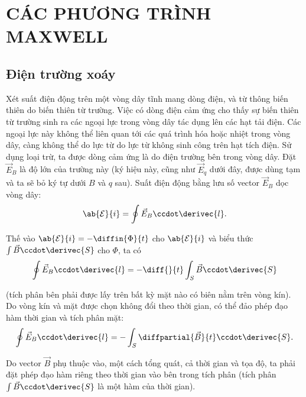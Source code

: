 

\chapter[CÁC PHƯƠNG TRÌNH MAXWELL]{CÁC PHƯƠNG TRÌNH MAXWELL}\label{chap:9}

\section{Điện trường xoáy}\label{sec:9_1}

Xét suất điện động trên một vòng dây tĩnh mang dòng điện, và từ thông biến thiên do biến thiên từ trường.
Việc có dòng điện cảm ứng cho thấy sự biến thiên từ trường sinh ra các ngoại lực trong vòng dây tác dụng lên các hạt tải điện.
Các ngoại lực này không thể liên quan tới các quá trình hóa hoặc nhiệt trong vòng dây, càng không thể do lực từ do lực từ không sinh công trên hạt tích điện.
Sử dụng loại trừ, ta được dòng cảm ứng là do điện trường bên trong vòng dây.
Đặt $\vec{E}_B$ là độ lớn của trường này (ký hiệu này, cũng như $\vec{E}_q$ dưới đây, được dùng tạm và ta sẽ bỏ ký tự dưới $B$ và $q$ sau).
Suất điện động bằng lưu số vector $\vec{E}_B$ dọc vòng dây:
\begin{equation}\label{eq:9_1}
    \ab{\mathcal{E}}{i} = \oint \vec{E}_B \ccdot \derivec{l}.
\end{equation}

Thế vào  $\ab{\mathcal{E}}{i} = -\diffin{\Phi}{t}$ cho $\ab{\mathcal{E}}{i}$ và biểu thức $\int\vec{B}\ccdot\derivec{S}$ cho $\Phi$, ta có
\begin{equation*}
    \oint \vec{E}_B \ccdot \derivec{l} = -\diff{}{t} \int_S \vec{B} \ccdot \derivec{S}
\end{equation*}

\noindent
(tích phân bên phải được lấy trên bất kỳ mặt nào có biên nằm trên vòng kín).
Do vòng kín và mặt được chọn không đổi theo thời gian, có thể đảo phép đạo hàm thời gian và tích phân mặt:
\vspace{-12pt}
\begin{equation}\label{eq:9_2}
    \oint \vec{E}_B \ccdot \derivec{l} =  - \int_S \diffpartial{\vec{B}}{t} \ccdot \derivec{S}.
\end{equation}

\noindent
Do vector $\vec{B}$ phụ thuộc vào, một cách tổng quát, cả thời gian và tọa độ, ta phải đặt phép đạo hàm riêng theo thời gian vào bên trong tích phân (tích phân $\int\vec{B}\ccdot\derivec{S}$ là một hàm của thời gian).

